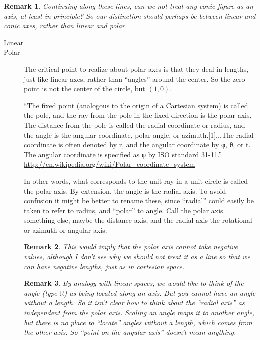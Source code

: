 \documentclass[12pt]{tufte-handout}
\numberwithin{equation}{subsection}
\numberwithin{equation}{subsection}
\newtheorem{remark}{Remark}
\newcommand\R{\(\mathds{R}\)}
\begin{document}
  \begin{remark}
    Continuing along these lines, can we not treat any conic figure
    as an axis, at least in principle?  So our distinction should
    perhaps be between linear and conic axes, rather than linear and
    polar.
  \end{remark}


  \begin{description}
  \item [Linear]
  \item [Polar]

    The critical point to realize about polar axes is that they deal
    in lengths, just like linear axes, rather than ``angles'' around
    the center.  So the zero point is not the center of the circle,
    but \((1,0)\).


    ``The fixed point (analogous to the origin of a
    Cartesian system) is called the pole, and the ray from the pole
    in the fixed direction is the polar axis. The distance from the
    pole is called the radial coordinate or radius, and the angle is
    the angular coordinate, polar angle, or azimuth.[1]...The radial
    coordinate is often denoted by r, and the angular coordinate by
    φ, θ, or t. The angular coordinate is specified as φ by ISO
    standard 31-11.''
    \url{http://en.wikipedia.org/wiki/Polar_coordinate_system}

    In other words, what corresponds to the unit ray in a unit
    circle is called the polar axis.  By extension, the angle is the
    radial axis.  To avoid confusion it might be better to rename
    these, since ``radial'' could easily be taken to refer to
    radius, and ``polar'' to angle.  Call the polar axis something
    else, maybe the distance axis, and the radial axis the
    rotational or azimuth or angular axis.

    \begin{remark}
      This would imply that the polar axis cannot take negative
      values, although I don't see why we should not treat it as a
      line so that we can have negative lengths, just as in
      cartesian space.
    \end{remark}


    \begin{remark}
      By analogy with linear spaces, we would like to think of the
      angle (type \R) as being located along an axis.  But you
      cannot have an angle without a length.  So it isn't clear how
      to think about the ``radial axis'' as independent from the
      polar axis.  Scaling an angle maps it to another angle, but
      there is no place to ``locate'' angles without a length, which
      comes from the other axis.  So ``point on the angular axis''
      doesn't mean anything.


\end{remark}
\end{description}
\end{document}
